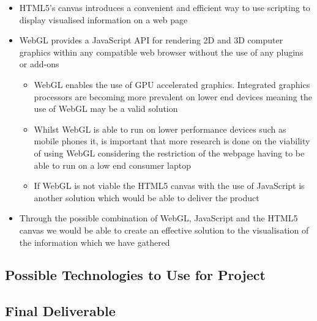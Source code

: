 \documentclass{article}
\begin{document}
\begin{itemize}
			\begin{itemize}
				\item HTML5's canvas introduces a convenient and efficient way to use scripting to display visualised information on a web page
				\item WebGL provides a JavaScript API for rendering 2D and 3D computer graphics within any compatible web browser without the use of any plugins or add-ons
				\begin{itemize}
					\item WebGL enables the use of GPU accelerated graphics. Integrated graphics processors are becoming more prevalent on lower end devices meaning the use of WebGL may be a valid solution
					\item Whilst WebGL is able to run on lower performance devices such as mobile phones it, is important that more research is done on the viability of using WebGL considering the restriction of the webpage having to be able to run on a low end consumer laptop
					\item If WebGL is not viable the HTML5 canvas with the use of JavaScript is another solution which would be able to deliver the product
				\end{itemize}
				\item Through the possible combination of WebGL, JavaScript and the HTML5 canvas we would be able to create an effective solution to the visualisation of the information which we have gathered
			\end{itemize}
		\end{itemize}
	\subsection{Possible Technologies to Use for Project}
	\subsection{Final Deliverable}
\end{document}

